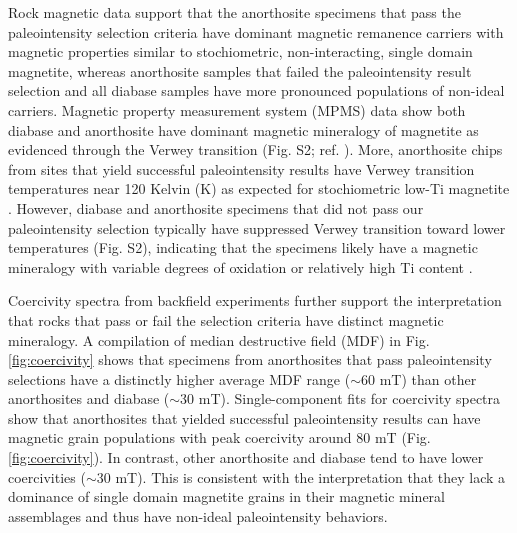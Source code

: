 \documentclass[9pt,twocolumn,twoside,lineno]{pnas-new}
\begin{document}
Rock magnetic data support that the anorthosite specimens that pass the paleointensity selection criteria have dominant magnetic remanence carriers with magnetic properties similar to stochiometric, non-interacting, single domain magnetite, whereas anorthosite samples that failed the paleointensity result selection and all diabase samples have more pronounced populations of non-ideal carriers. Magnetic property measurement system (MPMS) data show both diabase and anorthosite have dominant magnetic mineralogy of magnetite as evidenced through the Verwey transition (Fig. S2; ref. \citealp{Verwey1939a}). More, anorthosite chips from sites that yield successful paleointensity results have Verwey transition temperatures near 120 Kelvin (K) as expected for stochiometric low-Ti magnetite \cite{Ozdemir1993a}. However, diabase and anorthosite specimens that did not pass our paleointensity selection typically have suppressed Verwey transition toward lower temperatures (Fig. S2), indicating that the specimens likely have a magnetic mineralogy with variable degrees of oxidation or relatively high Ti content \cite{Ozdemir1993a}. 
 
Coercivity spectra from backfield experiments further support the interpretation that rocks that pass or fail the selection criteria have distinct magnetic mineralogy. A compilation of median destructive field (MDF) in Fig. \ref{fig:coercivity} shows that specimens from anorthosites that pass paleointensity selections have a distinctly higher average MDF range ($\sim$60 mT) than other anorthosites and diabase ($\sim$30 mT). Single-component fits for coercivity spectra \cite{Maxbauer2016a} show that anorthosites that yielded successful paleointensity results can have magnetic grain populations with peak coercivity around 80 mT (Fig. \ref{fig:coercivity}). In contrast, other anorthosite and diabase tend to have lower coercivities ($\sim$30 mT). This is consistent with the interpretation that they lack a dominance of single domain magnetite grains in their magnetic mineral assemblages and thus have non-ideal paleointensity behaviors.
\end{document}
